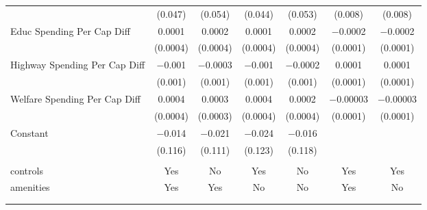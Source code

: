 \begin{table}[!htbp]
\begin{tabular}{@{\extracolsep{5pt}}lcccccc}
  & (0.047) & (0.054) & (0.044) & (0.053) & (0.008) & (0.008) \\ 
  Educ Spending Per Cap Diff & 0.0001 & 0.0002 & 0.0001 & 0.0002 & $-$0.0002 & $-$0.0002 \\ 
  & (0.0004) & (0.0004) & (0.0004) & (0.0004) & (0.0001) & (0.0001) \\ 
  Highway Spending Per Cap Diff & $-$0.001 & $-$0.0003 & $-$0.001 & $-$0.0002 & 0.0001 & 0.0001 \\ 
  & (0.001) & (0.001) & (0.001) & (0.001) & (0.0001) & (0.0001) \\ 
  Welfare Spending Per Cap Diff & 0.0004 & 0.0003 & 0.0004 & 0.0002 & $-$0.00003 & $-$0.00003 \\ 
  & (0.0004) & (0.0003) & (0.0004) & (0.0004) & (0.0001) & (0.0001) \\ 
  Constant & $-$0.014 & $-$0.021 & $-$0.024 & $-$0.016 &  &  \\ 
  & (0.116) & (0.111) & (0.123) & (0.118) &  &  \\ 
 \hline \\[-1.8ex] 
controls & Yes & No & Yes & No & Yes & Yes \\ 
amenities & Yes & Yes & No & No & Yes & No \\ 
\hline \\[-1.8ex] 
\hline 
\hline \\[-1.8ex] 
\end{tabular} 
\end{table} 
